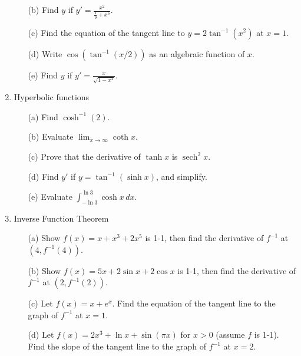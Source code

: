 \documentclass[12pt]{article}
\begin{document}
\begin{enumerate}
\begin{enumerate}
\item[(b)] Find $y$ if $y'=\frac{x^2}{\frac19+x^6}$.

\item[(c)] Find the equation of the tangent line to $y=2\tan^{-1}(x^2)$ at $x=1$.

\item[(d)] Write $\cos(\tan^{-1}(x/2))$ as an algebraic function of $x$.

\item[(e)] Find $y$ if $y'=\frac{x}{\sqrt{1-x^4}}$.

\end{enumerate}

\setcounter{enumi}{4}
\item Hyperbolic functions
\begin{enumerate}
\item[(a)] Find $\cosh^{-1}(2)$.

\item[(b)] Evaluate $\lim_{x\to\infty}\coth x$.

\item[(c)] Prove that the derivative of $\tanh x$ is $\operatorname{sech}^2x$.

\item[(d)] Find $y'$ if $y=\tan^{-1}(\sinh x)$, and simplify.

\item[(e)] Evaluate $\int_{-\ln3}^{\ln3}\cosh x\,dx$.

\end{enumerate}

\setcounter{enumi}{5}
\item Inverse Function Theorem
\begin{enumerate}
\item[(a)] Show $f(x)=x+x^3+2x^5$ is 1-1, then find the derivative of $f^{-1}$ at $(4,f^{-1}(4))$.

\item[(b)] Show $f(x)=5x+2\sin x+2\cos x$ is 1-1, then find the derivative of $f^{-1}$ at $(2,f^{-1}(2))$.

\item[(c)] Let $f(x)=x+e^x$. Find the equation of the tangent line to the graph of $f^{-1}$ at $x=1$.

\item[(d)] Let $f(x)=2x^3+\ln x+\sin(\pi x)$ for $x>0$ (assume $f$ is 1-1). Find the slope of the tangent line to the graph of $f^{-1}$ at $x=2$.

\end{enumerate}


\end{enumerate}
\end{document}
